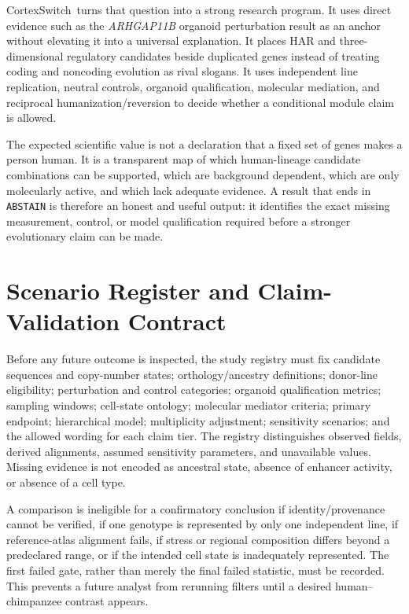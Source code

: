\documentclass[conference]{IEEEtran}
\newcommand{\csw}{CortexSwitch}
\newcommand{\abstain}{\texttt{ABSTAIN}}
\begin{document}
\csw{}~turns that question into a strong research program. It uses direct evidence such as the \emph{ARHGAP11B} organoid perturbation result as an anchor without elevating it into a universal explanation. It places HAR and three-dimensional regulatory candidates beside duplicated genes instead of treating coding and noncoding evolution as rival slogans. It uses independent line replication, neutral controls, organoid qualification, molecular mediation, and reciprocal humanization/reversion to decide whether a conditional module claim is allowed.

The expected scientific value is not a declaration that a fixed set of genes makes a person human. It is a transparent map of which human-lineage candidate combinations can be supported, which are background dependent, which are only molecularly active, and which lack adequate evidence. A result that ends in \abstain{} is therefore an honest and useful output: it identifies the exact missing measurement, control, or model qualification required before a stronger evolutionary claim can be made.

\appendices
\section{Scenario Register and Claim-Validation Contract}

Before any future outcome is inspected, the study registry must fix candidate sequences and copy-number states; orthology/ancestry definitions; donor-line eligibility; perturbation and control categories; organoid qualification metrics; sampling windows; cell-state ontology; molecular mediator criteria; primary endpoint; hierarchical model; multiplicity adjustment; sensitivity scenarios; and the allowed wording for each claim tier. The registry distinguishes observed fields, derived alignments, assumed sensitivity parameters, and unavailable values. Missing evidence is not encoded as ancestral state, absence of enhancer activity, or absence of a cell type.

A comparison is ineligible for a confirmatory conclusion if identity/provenance cannot be verified, if one genotype is represented by only one independent line, if reference-atlas alignment fails, if stress or regional composition differs beyond a predeclared range, or if the intended cell state is inadequately represented. The first failed gate, rather than merely the final failed statistic, must be recorded. This prevents a future analyst from rerunning filters until a desired human--chimpanzee contrast appears.
\end{document}
